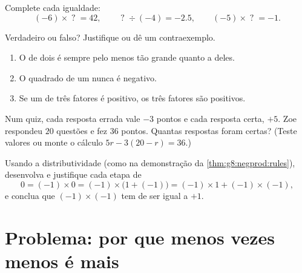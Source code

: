 \begin{exercise}[$\star\star$]\label{exo:g8:negprod:8}
Complete cada igualdade:
\[
(-6) \times \;?\; = 42, \qquad
\;?\; \div (-4) = -2.5, \qquad
(-5) \times \;?\; = -1 .
\]
\end{exercise}

\begin{exercise}[$\star\star$]\label{exo:g8:negprod:9}
Verdadeiro ou falso? Justifique ou dê um contraexemplo.
\begin{enumerate}
  \item O  de dois  é sempre pelo menos tão
        grande quanto a  deles.
  \item O quadrado de um  nunca é negativo.
  \item Se um  de três fatores é positivo, os três fatores são
        positivos.
\end{enumerate}
\end{exercise}

\begin{exercise}[$\star\star$]\label{exo:g8:negprod:10}
Num quiz, cada resposta errada vale $-3$ pontos e cada resposta certa,
$+5$. Zoe respondeu $20$ questões e fez $36$ pontos. Quantas respostas
foram certas? (Teste valores ou monte o cálculo
$5r - 3(20 - r) = 36$.)
\end{exercise}

\begin{exercise}[$\star\star\star$]\label{exo:g8:negprod:11}
Usando a distributividade (como na demonstração da
\cref{thm:g8:negprod:rules}), desenvolva e justifique cada etapa de
\[
0 = (-1) \times 0 = (-1) \times \bigl(1 + (-1)\bigr)
= (-1) \times 1 + (-1) \times (-1),
\]
e conclua que $(-1) \times (-1)$ tem de ser igual a $+1$.
\end{exercise}

\section{Problema: por que menos vezes menos é mais}

